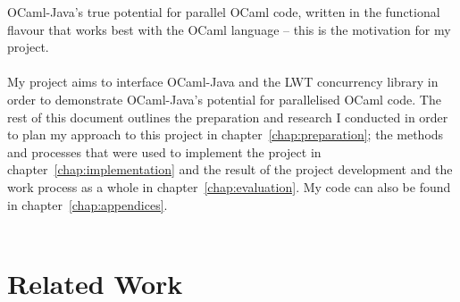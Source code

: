 \documentclass[12pt,twoside,notitlepage]{report}
\begin{document}
OCaml-Java's true potential for parallel OCaml code, written in the functional flavour that works best with the OCaml language -- this is the motivation for my project.
\\
\\
%
%
My project aims to interface OCaml-Java and the LWT concurrency library in order to demonstrate OCaml-Java's potential for parallelised OCaml code. The rest of this document outlines the preparation and research I conducted in order
to plan my approach to this project in chapter~\ref{chap:preparation}; the methods and processes that were used to implement the project in chapter~\ref{chap:implementation} and the result of the project development and the work
process as a whole in chapter~\ref{chap:evaluation}. My code can also be found in chapter~\ref{chap:appendices}.
\\
\\
%
%
\section{Related Work}
\label{sec:related_work}
\end{document}
